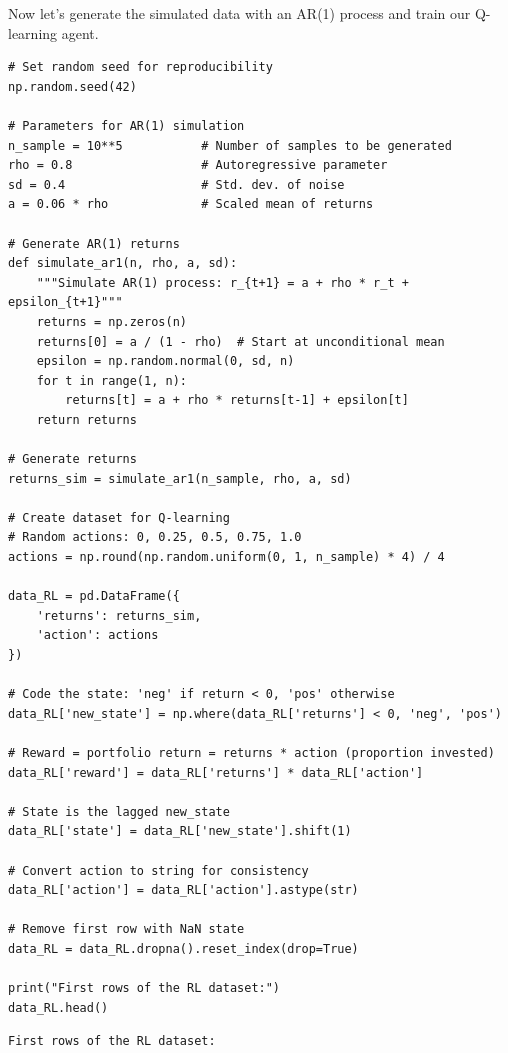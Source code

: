 Now let's generate the simulated data with an AR(1) process and train our Q-learning agent.

\begin{verbatim}
# Set random seed for reproducibility
np.random.seed(42)

# Parameters for AR(1) simulation
n_sample = 10**5           # Number of samples to be generated
rho = 0.8                  # Autoregressive parameter
sd = 0.4                   # Std. dev. of noise
a = 0.06 * rho             # Scaled mean of returns

# Generate AR(1) returns
def simulate_ar1(n, rho, a, sd):
    """Simulate AR(1) process: r_{t+1} = a + rho * r_t + epsilon_{t+1}"""
    returns = np.zeros(n)
    returns[0] = a / (1 - rho)  # Start at unconditional mean
    epsilon = np.random.normal(0, sd, n)
    for t in range(1, n):
        returns[t] = a + rho * returns[t-1] + epsilon[t]
    return returns

# Generate returns
returns_sim = simulate_ar1(n_sample, rho, a, sd)

# Create dataset for Q-learning
# Random actions: 0, 0.25, 0.5, 0.75, 1.0
actions = np.round(np.random.uniform(0, 1, n_sample) * 4) / 4

data_RL = pd.DataFrame({
    'returns': returns_sim,
    'action': actions
})

# Code the state: 'neg' if return < 0, 'pos' otherwise
data_RL['new_state'] = np.where(data_RL['returns'] < 0, 'neg', 'pos')

# Reward = portfolio return = returns * action (proportion invested)
data_RL['reward'] = data_RL['returns'] * data_RL['action']

# State is the lagged new_state
data_RL['state'] = data_RL['new_state'].shift(1)

# Convert action to string for consistency
data_RL['action'] = data_RL['action'].astype(str)

# Remove first row with NaN state
data_RL = data_RL.dropna().reset_index(drop=True)

print("First rows of the RL dataset:")
data_RL.head()
\end{verbatim}

\begin{verbatim}
First rows of the RL dataset:
\end{verbatim}

